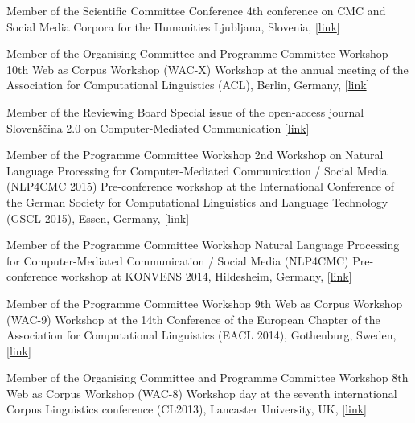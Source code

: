         {Member of the Scientific Committee}
        {Conference}
        {4th conference on CMC and Social Media Corpora for the Humanities}
        {Ljubljana, Slovenia, [\href{http://nl.ijs.si/janes/cmc-corpora2016/}{link}]}
        {}

        {Member of the Organising Committee and Programme Committee}
        {Workshop}
        {10th Web as Corpus Workshop (WAC-X)}
        {Workshop at the annual meeting of the Association for Computational
        Linguistics (ACL), Berlin, Germany,
        [\href{https://www.sigwac.org.uk/wiki/WAC-X}{link}]}
        {}

        {Member of the Reviewing Board} 
        {Special issue of the open-access
         journal Slovenščina 2.0 on Computer-Mediated Communication}
        {} 
        {[\href{http://www.trojina.org/slovenscina2.0/en/}{link}]}
        {}

        {Member of the Programme Committee}
        {Workshop}
        {2nd Workshop on Natural Language Processing for Computer-Mediated Communication /
        Social Media (NLP4CMC 2015)}
        {Pre-conference workshop at the International Conference of the German
        Society for Computational Linguistics and Language Technology
        (GSCL-2015), Essen, Germany, [\href{https://sites.google.com/site/nlp4cmc2015/}{link}]}
        {}

        {Member of the Programme Committee}
        {Workshop}
        {Natural Language Processing for Computer-Mediated Communication /
        Social Media (NLP4CMC)}
        {Pre-conference workshop at KONVENS 2014, Hildesheim, Germany,
        [\href{https://sites.google.com/site/nlp4cmc/}{link}]}
        {}

        {Member of the Programme Committee}
        {Workshop}
        {9th Web as Corpus Workshop (WAC-9)}
        {Workshop at the 14th Conference of the European Chapter of the
        Association for Computational Linguistics (EACL 2014), Gothenburg,
        Sweden, [\href{https://sigwac.org.uk/wiki/WAC9}{link}]}
        {}

        {Member of the Organising Committee and Programme Committee}
        {Workshop}
        {8th Web as Corpus Workshop (WAC-8)}
        {Workshop day at the seventh international Corpus Linguistics
        conference (CL2013), Lancaster University, UK,
        [\href{https://sigwac.org.uk/wiki/WAC8}{link}]}
        {}




